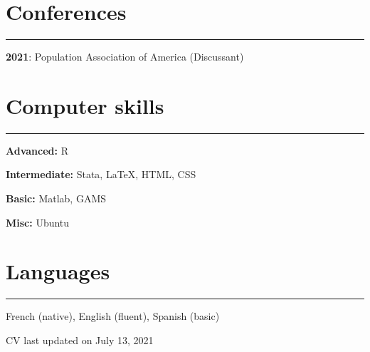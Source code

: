 \documentclass[
]{article}
\newcommand{\sectionline}{%
  \vspace{-0.2cm}%
  \hrule%
  \vspace{0.3cm}%
}
\let\xsection=\section
\renewcommand{\section}[1]{%
  \xsection*{#1}%
  \sectionline%
}
\begin{document}
\hypertarget{conferences}{%
\section{Conferences}\label{conferences}}

\textbf{2021}: Population Association of America (Discussant)

\hypertarget{computer-skills}{%
\section{Computer skills}\label{computer-skills}}

\textbf{Advanced:} R

\textbf{Intermediate:} Stata, LaTeX, HTML, CSS

\textbf{Basic:} Matlab, GAMS

\textbf{Misc:} Ubuntu

\hypertarget{languages}{%
\section{Languages}\label{languages}}

French (native), English (fluent), Spanish (basic)

\vspace{2cm}

\begin{center}
CV last updated on July 13, 2021
\end{center}
\end{document}
